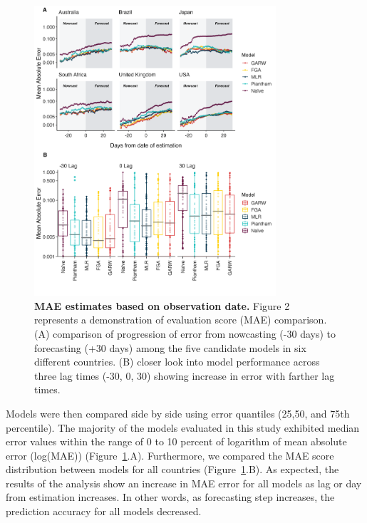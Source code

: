 \documentclass[11pt,oneside,letterpaper]{article}
\begin{document}
\begin{figure}[H]
	\centering
	\includegraphics[width=0.8\textwidth]{figures/model_comp.png}
	\caption{\textbf{MAE estimates based on observation date.}
	Figure 2 represents a demonstration of evaluation score (MAE) comparison. 
	(A) comparison of progression of error from nowcasting (-30 days) to forecasting (+30 days) among the five candidate models in six different countries.
	(B) closer look into model performance across three lag times (-30, 0, 30) showing increase in error with farther lag times. 
	}
	\label{Figure 2}
\end{figure}


Models were then compared side by side using error quantiles (25,50, and 75th percentile).
The majority of the models evaluated in this study exhibited median error values within the range of 0 to 10 percent of logarithm of mean absolute error (log(MAE)) (Figure~\ref{Figure 2}.A).
Furthermore, we compared the MAE score distribution between models for all countries (Figure~\ref{Figure 2}.B).
As expected, the results of the analysis show an increase in MAE error for all models as lag or day from estimation increases. 
In other words, as forecasting step increases, the prediction accuracy for all models decreased.
\end{document}
